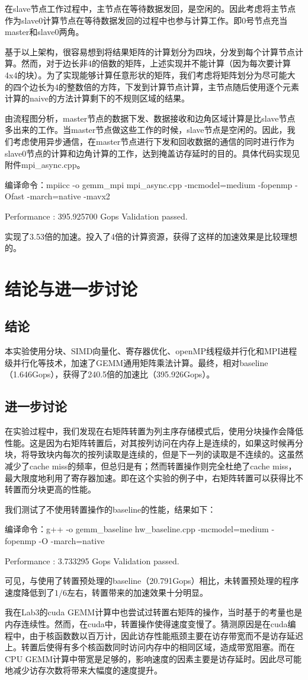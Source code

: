 \documentclass[UTF8,10pt]{ctexart}
\begin{document}
在slave节点工作过程中，主节点在等待数据发回，是空闲的。因此考虑将主节点作为slave0计算节点在等待数据发回的过程中也参与计算工作。即0号节点充当master和slave0两角。

基于以上架构，很容易想到将结果矩阵的计算划分为四块，分发到每个计算节点计算。然而，对于边长非4的倍数的矩阵，上述实现并不能计算（因为每次要计算4x4的块）。为了实现能够计算任意形状的矩阵，我们考虑将矩阵划分为尽可能大的四个边长为4的整数倍的方阵，下发到计算节点计算，主节点随后使用逐个元素计算的naive的方法计算剩下的不规则区域的结果。

由流程图分析，master节点的数据下发、数据接收和边角区域计算是比slave节点多出来的工作。当master节点做这些工作的时候，slave节点是空闲的。因此，我们考虑使用异步通信，在master节点进行下发和回收数据的通信的同时进行作为slave0节点的计算和边角计算的工作，达到掩盖访存延时的目的。具体代码实现见附件mpi\_async.cpp。
\begin{python}
编译命令：mpiicc -o gemm_mpi mpi_async.cpp -mcmodel=medium -fopenmp -Ofast -march=native -mavx2
\end{python}
\begin{python}
Performance : 395.925700 Gops
Validation passed.
\end{python}
实现了3.53倍的加速。投入了4倍的计算资源，获得了这样的加速效果是比较理想的。

\section{结论与进一步讨论}
\subsection{结论}
本实验使用分块、SIMD向量化、寄存器优化、openMP线程级并行化和MPI进程级并行化等技术，加速了GEMM通用矩阵乘法计算。最终，相对baseline（1.646Gops），获得了240.5倍的加速比（395.926Gops）。

\subsection{进一步讨论}
在实验过程中，我们发现在右矩阵转置为列主序存储模式后，使用分块操作会降低性能。这是因为右矩阵转置后，对其按列访问在内存上是连续的，如果这时候再分块，将导致块内每次的按列读取是连续的，但是下一列的读取是不连续的。这虽然减少了cache miss的频率，但总归是有；然而转置操作则完全杜绝了cache miss，最大限度地利用了寄存器加速。即在这个实验的例子中，右矩阵转置可以获得比不转置而分块更高的性能。

我们测试了不使用转置操作的baseline的性能，结果如下：
\begin{python}
编译命令：g++ -o gemm_baseline hw_baseline.cpp -mcmodel=medium -fopenmp -O -march=native
\end{python}
\begin{python}
Performance : 3.733295 Gops
Validation passed.
\end{python}
可见，与使用了转置预处理的baseline（20.791Gops）相比，未转置预处理的程序速度降低到了$1/6$左右，转置带来的加速效果十分明显。

我在Lab3的cuda GEMM计算中也尝试过转置右矩阵的操作，当时基于的考量也是内存连续性。然而，在cuda中，转置操作使得速度变慢了。猜测原因是在cuda编程中，由于核函数数以百万计，因此访存性能瓶颈主要在访存带宽而不是访存延迟上。转置后使得有多个核函数同时访问内存中的相同区域，造成带宽阻塞。而在CPU GEMM计算中带宽是足够的，影响速度的因素主要是访存延时。因此尽可能地减少访存次数将带来大幅度的速度提升。
\end{document}
